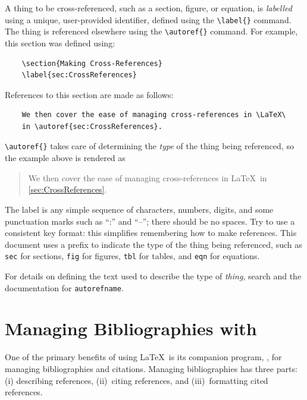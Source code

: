A thing to be cross-referenced, such as a section, figure, or equation,
is \emph{labelled} using a unique, user-provided identifier, defined
using the \verb+\label{}+ command.  
The thing is referenced elsewhere using the \verb+\autoref{}+ command.
For example, this section was defined using:
\begin{lstlisting}
    \section{Making Cross-References}
    \label{sec:CrossReferences}
\end{lstlisting}
References to this section are made as follows:
\begin{lstlisting}
    We then cover the ease of managing cross-references in \LaTeX\
    in \autoref{sec:CrossReferences}.
\end{lstlisting}
\verb+\autoref{}+ takes care of determining the \emph{type} of the 
thing being referenced, so the example above is rendered as
\begin{quote}
    We then cover the ease of managing cross-references in \LaTeX\
    in \autoref{sec:CrossReferences}.
\end{quote}

The label is any simple sequence of characters, numbers, digits,
and some punctuation marks such as ``:'' and ``--''; there should
be no spaces.  Try to use a consistent key format: this simplifies
remembering how to make references.  This document uses a prefix
to indicate the type of the thing being referenced, such as \texttt{sec}
for sections, \texttt{fig} for figures, \texttt{tbl} for tables,
and \texttt{eqn} for equations.

For details on defining the text used to describe the type
of \emph{thing}, search  and the 
documentation for \texttt{autorefname}.


\section{Managing Bibliographies with \BibTeX}
\label{sec:BibTeX}

One of the primary benefits of using \LaTeX\ is its companion program,
\BibTeX, for managing bibliographies and citations.  Managing
bibliographies has three parts: (i) describing references,
(ii)~citing references, and (iii)~formatting cited references.

